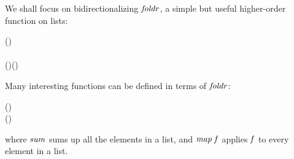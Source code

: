 We shall focus on bidirectionalizing \ensuremath{\Varid{foldr}}, a simple but useful higher-order function on lists:
\begin{hscode}\SaveRestoreHook
{}%
%
%
%
\>[3]{}\mathbin{::}(\to {}\to {})\to {}\to {}\<[E]%
\\
\>[3]{}\;\;\<[21]%
\>[21]{}\mathrel{=}\<[E]%
\\
\>[3]{}\;\;\;(\mathbin{:}){}\<[21]%
\>[21]{}\mathrel{=}\;\;(\;\;\;){}\<[E]%
\ColumnHook
\end{hscode}\resethooks
Many interesting functions can be defined in terms of \ensuremath{\Varid{foldr}}: \begin{hscode}\SaveRestoreHook
{}%
%
%
%
\>[3]{}\<[14]%
\>[14]{}\mathrel{=}\;(\mathbin{+})\;\<[E]%
\\
\>[3]{}\;\<[14]%
\>[14]{}\mathrel{=}\;(\lambda {}\;\to {}\;\mathbin{:})\<[E]%
\ColumnHook
\end{hscode}\resethooks
where \ensuremath{\Varid{sum}} sums up all the elements in a list, and \ensuremath{\Varid{map}\;\Varid{f}} applies \ensuremath{\Varid{f}} to
every element in a list.

